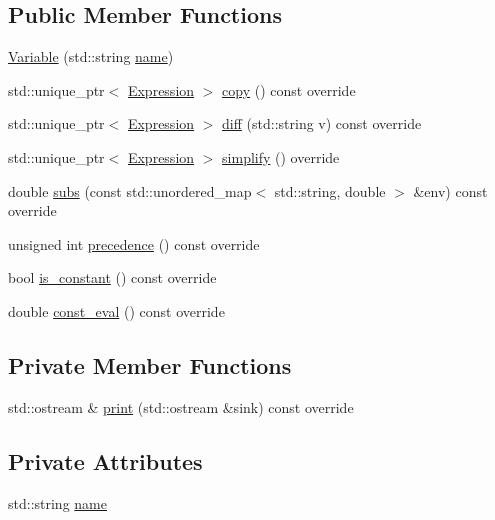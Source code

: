 \subsection*{Public Member Functions}
\begin{DoxyCompactItemize}
\item 
\mbox{\hyperlink{classsymcpp_1_1Variable_abe52e6589e8189c46011530bed23f5cc}{Variable}} (std\+::string \mbox{\hyperlink{classsymcpp_1_1Variable_a626cca9e1586e5d60f31446a06c6203f}{name}})
\item 
std\+::unique\+\_\+ptr$<$ \mbox{\hyperlink{classsymcpp_1_1Expression}{Expression}} $>$ \mbox{\hyperlink{classsymcpp_1_1Variable_a5a434805a53a7c46e3659a8efdc7ba80}{copy}} () const override
\item 
std\+::unique\+\_\+ptr$<$ \mbox{\hyperlink{classsymcpp_1_1Expression}{Expression}} $>$ \mbox{\hyperlink{classsymcpp_1_1Variable_ae17a02824954066f4e8b1ed6ba799ff0}{diff}} (std\+::string v) const override
\item 
std\+::unique\+\_\+ptr$<$ \mbox{\hyperlink{classsymcpp_1_1Expression}{Expression}} $>$ \mbox{\hyperlink{classsymcpp_1_1Variable_afd613d28c73d738fc0cf90b70e1820bb}{simplify}} () override
\item 
double \mbox{\hyperlink{classsymcpp_1_1Variable_a1dfbef67a237aa2533d8dc88c378d08b}{subs}} (const std\+::unordered\+\_\+map$<$ std\+::string, double $>$ \&env) const override
\item 
unsigned int \mbox{\hyperlink{classsymcpp_1_1Variable_a4b998019a17f29482772f1f945398ff3}{precedence}} () const override
\item 
bool \mbox{\hyperlink{classsymcpp_1_1Variable_a1ccd5094922661828039f16b77974fe0}{is\+\_\+constant}} () const override
\item 
double \mbox{\hyperlink{classsymcpp_1_1Variable_a822c9e3e85da6e89949a9f2df7244f5c}{const\+\_\+eval}} () const override
\end{DoxyCompactItemize}
\subsection*{Private Member Functions}
\begin{DoxyCompactItemize}
\item 
std\+::ostream \& \mbox{\hyperlink{classsymcpp_1_1Variable_a10ce030c1648fae51534712155ffcab1}{print}} (std\+::ostream \&sink) const override
\end{DoxyCompactItemize}
\subsection*{Private Attributes}
\begin{DoxyCompactItemize}
\item 
std\+::string \mbox{\hyperlink{classsymcpp_1_1Variable_a626cca9e1586e5d60f31446a06c6203f}{name}}
\end{DoxyCompactItemize}


